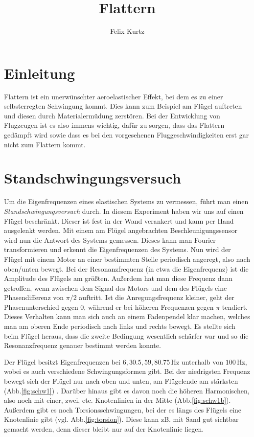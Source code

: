 \documentclass[12pt,a4paper,headinclude,bibtotoc]{scrartcl}
\begin{document}
\title{Flattern}
\author{Felix Kurtz}
\maketitle

\section{Einleitung}
Flattern ist ein unerwünschter aeroelastischer Effekt, bei dem es zu einer selbsterregten Schwingung kommt.
Dies kann zum Beispiel am Flügel auftreten und diesen durch Materialermüdung zerstören.
Bei der Entwicklung von Flugzeugen ist es also immens wichtig, dafür zu sorgen, dass das Flattern gedämpft wird sowie dass es bei den vorgesehenen Fluggeschwindigkeiten erst gar nicht zum Flattern kommt.

\section{Standschwingungsversuch}
Um die Eigenfrequenzen eines elastischen Systems zu vermessen, führt man einen \textit{Standschwingungsversuch} durch.
In diesem Experiment haben wir uns auf einen Flügel beschränkt.
Dieser ist fest in der Wand verankert und kann per Hand ausgelenkt werden.
Mit einem am Flügel angebrachten Beschleunigungssensor wird nun die Antwort des Systems gemessen.
Dieses kann man Fourier-transformieren und erkennt die Eigenfrequenzen des Systems.
Nun wird der Flügel mit einem Motor an einer bestimmten Stelle periodisch angeregt, also nach oben/unten bewegt.
Bei der Resonanzfrequenz (in etwa die Eigenfrequenz) ist die Amplitude des Flügels am größten.
Außerdem hat man diese Frequenz dann getroffen, wenn zwischen dem Signal des Motors und dem des Flügels eine Phasendifferenz von $\pi/2$ auftritt.
Ist die Anregungsfrequenz kleiner, geht der Phasenunterschied gegen $0$, während er bei höheren Frequenzen gegen $\pi$ tendiert.
Dieses Verhalten kann man sich auch an einem Fadenpendel klar machen, welches man am oberen Ende periodisch nach links und rechts bewegt.
Es stellte sich beim Flügel heraus, dass die zweite Bedingung wesentlich schärfer war und so die Resonanzfrequenz genauer bestimmt werden konnte.

Der Flügel besitzt Eigenfrequenzen bei $6, 30.5, 59, 80.75\,$Hz unterhalb von $100\,$Hz, wobei es auch verschiedene Schwingungsformen gibt.
Bei der niedrigsten Frequenz  bewegt sich der Flügel nur nach oben und unten, am Flügelende am stärksten (Abb.\ref{fig:schw1}) .
Darüber hinaus gibt es davon noch die höheren Harmonischen, also noch mit einer, zwei, etc. Knotenlinien in der Mitte (Abb.\ref{fig:schw1b}).
Außerdem gibt es noch Torsionsschwingungen, bei der es längs des Flügels eine Knotenlinie gibt (vgl. Abb.\ref{fig:torsion}).
Diese kann zB. mit Sand gut sichtbar gemacht werden, denn dieser bleibt nur auf der Knotenlinie liegen.
\end{document}
